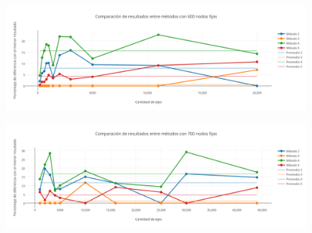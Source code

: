  \newpage
   \begin{figure}[h!]
   \begin{center}
 	\includegraphics[scale=0.55]{imagenes/local/resultados/600nodos.png}
   \end{center}
 \end{figure}

  \begin{figure}[h!]
   \begin{center}
 	\includegraphics[scale=0.55]{imagenes/local/resultados/700nodos.png}
   \end{center}
 \end{figure} 


\newpage